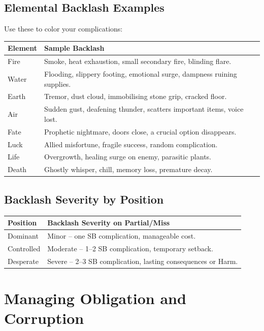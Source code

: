\subsection*{Elemental Backlash Examples}
\label{subsec:elemental-backlash}
Use these to color your complications:

\begin{center}
\begin{tabular}{ll}
\toprule
\textbf{Element} & \textbf{Sample Backlash} \\
\midrule
Fire & Smoke, heat exhaustion, small secondary fire, blinding flare. \\
Water & Flooding, slippery footing, emotional surge, dampness ruining supplies. \\
Earth & Tremor, dust cloud, immobilising stone grip, cracked floor. \\
Air & Sudden gust, deafening thunder, scatters important items, voice lost. \\
Fate & Prophetic nightmare, doors close, a crucial option disappears. \\
Luck & Allied misfortune, fragile success, random complication. \\
Life & Overgrowth, healing surge on enemy, parasitic plants. \\
Death & Ghostly whisper, chill, memory loss, premature decay. \\
\bottomrule
\end{tabular}
\end{center}

\subsection*{Backlash Severity by Position}
\label{subsec:backlash-severity}
\begin{center}
\begin{tabular}{ll}
\toprule
\textbf{Position} & \textbf{Backlash Severity on Partial/Miss} \\
\midrule
Dominant & Minor – one SB complication, manageable cost. \\
Controlled & Moderate – 1–2 SB complication, temporary setback. \\
Desperate & Severe – 2–3 SB complication, lasting consequences or Harm. \\
\bottomrule
\end{tabular}
\end{center}

\section{Managing Obligation and Corruption}
\label{sec:obligation-corruption-gm}

